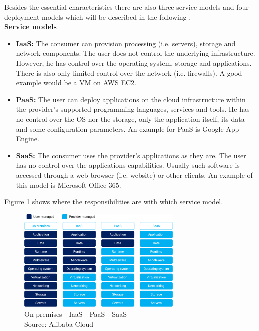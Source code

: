 Besides the essential characteristics there are also three service models and four deployment models which will be described in the following \cite{Mell:2011:SND:2206223, IBMCC}.\\
\newline
\textbf{Service models}
\begin{itemize}
    \item \textbf{\gls{IaaS}:} The consumer can provision processing (i.e. servers), storage and network components. The user does not control the underlying infrastructure. However, he has control over the operating system, storage and applications. There is also only limited control over the network (i.e. firewalls). A good example would be a \gls{VM} on \gls{AWS} \gls{EC2}.
    \item \textbf{\gls{PaaS}:} The user can deploy applications on the cloud infrastructure within the provider's supported programming languages, services and tools. He has no control over the \gls{OS} nor the storage, only the application itself, its data and some configuration parameters. An example for \gls{PaaS} is Google App Engine.
    \item \textbf{\gls{SaaS}:} The consumer uses the provider's applications as they are. The user has no control over the applications capabilities. Usually such software is accessed through a web browser (i.e. website) or other clients. An example of this model is Microsoft Office 365.
\end{itemize}
Figure \ref{fig:iaas} shows where the responsibilities are with which service model.

\begin{figure}[htp]
\begin{center}
\includegraphics[width=0.7\textwidth]{bilder/iaas.png}
\captionsetup[table]{justification=centering, labelfont=bf}
\caption[On premises - IaaS - PaaS - SaaS]{On premises - IaaS - PaaS - SaaS\\Source: Alibaba Cloud \cite{alibaba}}
\label{fig:iaas}
\end{center}
\end{figure}

